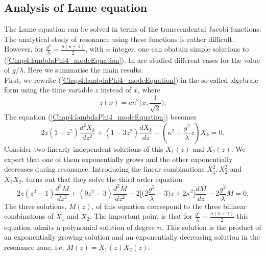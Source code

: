 \documentclass[11pt,a4paper,twoside]{book}
\begin{document}
\subsection{Analysis of Lame equation}
The Lame equation can be solved in terms of the transcendental Jacobi functions. The analytical study of resonance using these functions is rather difficult. However, for $\frac{g^{2}}{\lambda}=\frac{n(n+1)}{2}  $, with $ n  $ integer, one can obatain simple solutions to (\ref{Chap4:lambdaPhi4_modeEquation}). In \cite{Chap4:ModelLambdaPhi4Reference} are studied different cases for the value of $ g/\lambda $. Here we summarise the main results.\\
First, we rewrite (\ref{Chap4:lambdaPhi4_modeEquation}) in the so-called algebraic form using the time variable $ z $ instead of $ x $, where
\begin{equation}
	\label{Chap4:lambdaPhi4}
	z(x)=cn^{2}\Bigg(x,\frac{1}{\sqrt{2}}\Bigg).
\end{equation}
The equation (\ref{Chap4:lambdaPhi4_modeEquation}) becomes
\begin{equation}
\label{Chap4:lambdaPhi4_fluctuations}
2z(1-z^{2})\frac{d^{2}X_{k}}{dz^{2}} + (1-3z^{2})\frac{dX_{k}}{dz} + (\kappa^{2} + \frac{g^{2}}{\lambda}z)X_{k}=0.
\end{equation}
Consider two linearly-independent solutions of this $ X_{1}(z) $ and $ X_{2}(z) $. We expect that one of them exponentially grows and the other exponentially decreases during resonance. Introducing the linear combinations $ X_{1}^{2}, X_{2}^{2} $ and $ X_{1}X_{2} $,  turns out that they solve the third order equation 
\begin{equation}
\label{Chap4:lambdaPhi4_equationForMz}
2z(z^{2}-1)\frac{d^{3}M}{dz^{3}} + (9z^{2}-3)\frac{d^{2}M}{dz^{2}} -2\Bigg[\bigg(2\frac{g^{2}}{\lambda} - 3\bigg)z + 2\kappa^{2}\Bigg]\frac{dM}{dz} - 2\frac{g^{2}}{\lambda}M = 0.
\end{equation}
The three solutions, $ M(z) $, of this equation correspond to the three bilinear combinations of $ X_{1} $ and $ X_{2} $. The important point is that for $ \frac{g^{2}}{\lambda} = \frac{n(n+1)}{2} $ this equation admits a polynomial solution of degree $ n $. This solution is the product of an exponentially growing solution and an exponentially decreasing solution in the resonance zone, i.e. $ M(z)=X_{1}(z)X_{2}(z) $.
\end{document}

